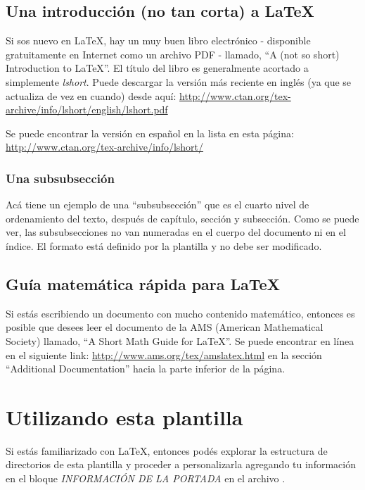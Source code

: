 \subsection{Una introducción (no tan corta) a \LaTeX{}}

Si sos nuevo en \LaTeX{}, hay un muy buen libro electrónico - disponible gratuitamente en Internet como un archivo PDF - llamado, \enquote{A (not so short) Introduction to \LaTeX{}}. El título del libro es generalmente acortado a simplemente \emph{lshort}. Puede descargar la versión más reciente en inglés (ya que se actualiza de vez en cuando) desde aquí:
\url{http://www.ctan.org/tex-archive/info/lshort/english/lshort.pdf}

Se puede encontrar la versión en español en la lista en esta página: \url{http://www.ctan.org/tex-archive/info/lshort/}

\subsubsection{Una subsubsección}

Acá tiene un ejemplo de una ``subsubsección'' que es el cuarto nivel de ordenamiento del texto, después de capítulo, sección y subsección.  Como se puede ver, las subsubsecciones no van numeradas en el cuerpo del documento ni en el índice.  El formato está definido por la plantilla y no debe ser modificado.

\subsection{Guía matemática rápida para \LaTeX{}}

Si estás escribiendo un documento con mucho contenido matemático, entonces es posible que desees leer el documento de la AMS (American Mathematical Society) llamado, \enquote{A Short Math Guide for \LaTeX{}}. Se puede encontrar en línea en el siguiente link: \url{http://www.ams.org/tex/amslatex.html} en la sección \enquote{Additional Documentation} hacia la parte inferior de la página.



\section{Utilizando esta plantilla}

Si estás familiarizado con \LaTeX{}, entonces podés explorar la estructura de directorios de esta plantilla y proceder a personalizarla agregando tu información en el bloque \emph{INFORMACIÓN DE LA PORTADA} en el archivo .  

